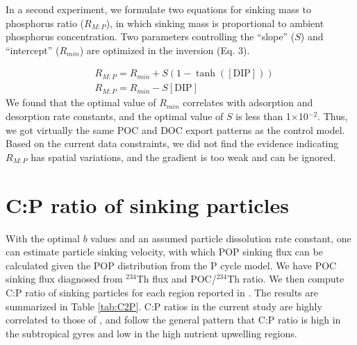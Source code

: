 In a second experiment, we formulate two equations for sinking mass to phosphorus ratio ($R_{M:P}$), in which sinking mass is proportional to ambient phosphorus concentration.
Two parameters controlling the ``slope'' ($S$) and ``intercept'' ($R_{min}$) are optimized in the inversion (Eq. 3).

\begin{equation}
\begin{split}
  &R_{M:P} = R_{min}+S(1-\tanh([\mathrm{DIP}]))\\
  &R_{M:P} = R_{min}-S[\mathrm{DIP}]
\end{split}
\end{equation}
We found that the optimal value of $R_{min}$ correlates with adsorption and desorption rate constants, and the optimal value of $S$ is less than 1$\times$10$^{-2}$. Thus, we got virtually the same POC and DOC export patterns as the control model. Based on the current data constraints, we did not find the evidence indicating $R_{M:P}$ has spatial variations, and the gradient is too weak and can be ignored.

\section{C:P ratio of sinking particles}
With the optimal $b$ values and an assumed particle dissolution rate constant, one can estimate particle sinking velocity\citep{kriest2008}, with which POP sinking flux can be calculated given the POP distribution from the P cycle model.
We have POC sinking flux diagnosed from $^{234}$Th flux and POC/$^{234}$Th ratio.
We then compute C:P ratio of sinking particles for each region reported in \cite{Teng2014}.
The results are summarized in Table \ref{tab:C2P}.
C:P ratios in the current study are highly correlated to those of \cite{Teng2014}, and follow the general pattern that C:P ratio is high in the subtropical gyres and low in the high nutrient upwelling regions.

